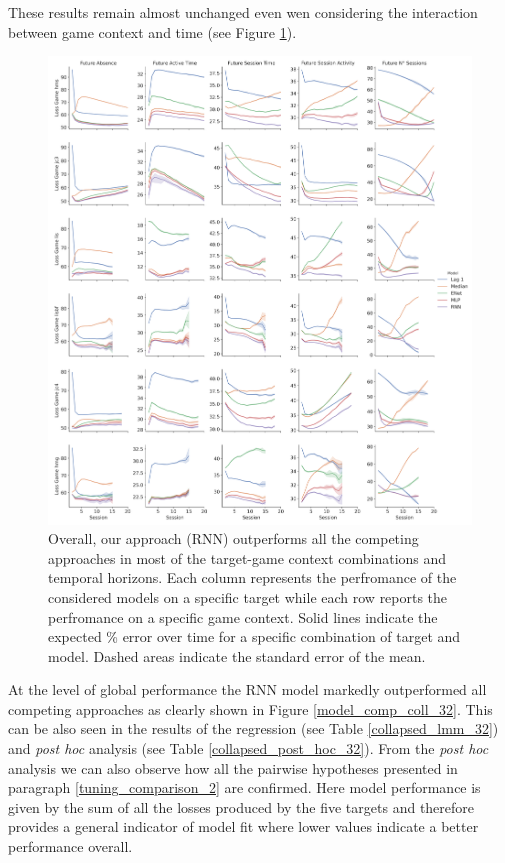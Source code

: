These results remain almost unchanged even wen considering the interaction between game context and time (see Figure \ref{model_comp_non_coll_32}).
\begin{figure}[h]
\centering
\includegraphics[height=0.5\textheight,keepaspectratio]{images/chapter_3/models_comparison_non_collapsed_32.png}
\caption[\textbf{Model comparison without collapsing}]{ Overall, our approach (RNN) outperforms all the competing approaches in most of the target-game context combinations and temporal horizons. Each column represents the perfromance of the considered models on a specific target while each row reports the perfromance on a specific game context. Solid lines indicate the expected \% error over time for a specific combination of target and model. Dashed areas indicate the standard error of the mean.}
\label{model_comp_non_coll_32} 
\end{figure}
At the level of global performance the RNN model markedly outperformed all competing approaches as clearly shown in Figure \ref{model_comp_coll_32}. This can be also seen in the results of the regression (see Table \ref{collapsed_lmm_32}) and  \textit{post hoc} analysis (see Table \ref{collapsed_post_hoc_32}). From the \textit{post hoc} analysis we can also observe how all the pairwise hypotheses presented in paragraph \ref{tuning_comparison_2} are confirmed. Here model performance is given by the sum of all the losses produced by the five targets and therefore provides a general indicator of model fit where lower values indicate a better performance overall.
